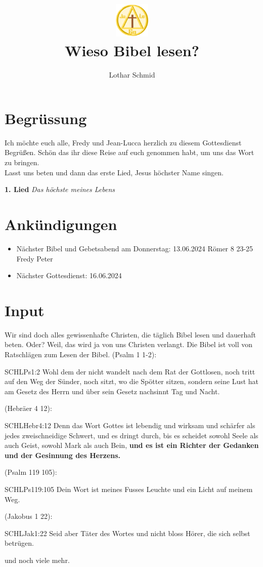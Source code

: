 \documentclass{../inc/mybib}
\title{\includegraphics[height=48pt]{../assets/images/logo.png}\\Wieso Bibel lesen?}
\author{Lothar Schmid}
\begin{document}
\maketitle

\section{Begrüssung}
Ich möchte euch alle, Fredy und Jean-Lucca herzlich zu diesem Gottesdienst Begrüßen. Schön das ihr diese Reise auf euch genommen habt, um uns das Wort zu bringen. \\Lasst uns beten und dann das erste Lied, Jesus höchster Name singen.

\textbf{1. Lied}
\textit{Das höchste meines Lebens}

\section{Ankündigungen}
\begin{itemize}
    \item Nächster Bibel und Gebetsabend am Donnerstag: 
13.06.2024 Römer 8 23-25 Fredy Peter
    \item Nächster Gottesdienst: 16.06.2024 
\end{itemize}

\section{ Input }

Wir sind doch alles gewissenhafte Christen, die täglich Bibel lesen und dauerhaft beten. Oder? Weil, das wird ja von uns Christen verlangt. Die Bibel ist voll von Ratschlägen zum Lesen der Bibel. 
(Psalm 1 1-2):
\begin{bibelbox}{SCHL}{Ps}{1:2}
Wohl dem der nicht wandelt nach dem Rat der Gottlosen, noch tritt auf den Weg der Sünder, noch sitzt, wo die Spötter sitzen, sondern seine Lust hat am Gesetz des Herrn und über sein Gesetz nachsinnt Tag und Nacht.
\end{bibelbox}
(Hebräer 4 12):
\begin{bibelbox}{SCHL}{Hebr}{4:12}
Denn das Wort Gottes ist lebendig und wirksam und schärfer als jedes zweischneidige Schwert, und es dringt durch, bis es scheidet sowohl Seele als auch Geist, sowohl Mark als auch Bein, \textbf{und es ist ein Richter der Gedanken und der Gesinnung des Herzens.}
\end{bibelbox}
(Psalm 119 105):
\begin{bibelbox}{SCHL}{Ps}{119:105}
Dein Wort ist meines Fusses Leuchte und ein Licht auf meinem Weg.
\end{bibelbox}
(Jakobus 1 22):
\begin{bibelbox}{SCHL}{Jak}{1:22}
Seid aber Täter des Wortes und nicht bloss Hörer, die sich selbst betrügen.
\end{bibelbox}
und noch viele mehr.
\end{document}
